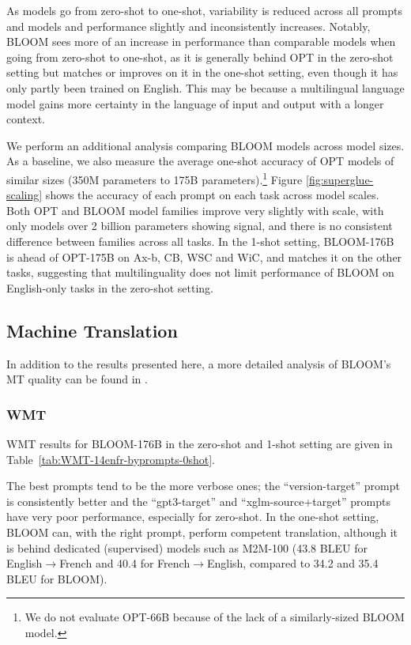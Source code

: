 As models go from zero-shot to one-shot, variability is reduced across all prompts and models and performance slightly and inconsistently increases. Notably, BLOOM sees more of an increase in performance than comparable models when going from zero-shot to one-shot, as it is generally behind OPT in the zero-shot setting but matches or improves on it in the one-shot setting, even though it has only partly been trained on English. This may be because a multilingual language model gains more certainty in the language of input and output with a longer context.

We perform an additional analysis comparing BLOOM models across model sizes.  As a baseline, we also measure the average one-shot accuracy of OPT models of similar sizes (350M parameters to 175B parameters).\footnote{We do not evaluate OPT-66B because of the lack of a similarly-sized BLOOM model.} Figure \ref{fig:superglue-scaling} shows the accuracy of each prompt on each task across model scales. Both OPT and BLOOM model families improve very slightly with scale, with only models over 2 billion parameters showing signal, and there is no consistent difference between families across all tasks. In the 1-shot setting, BLOOM-176B is ahead of OPT-175B on Ax-b, CB, WSC and WiC, and matches it on the other tasks, suggesting that multilinguality does not limit performance of BLOOM on English-only tasks in the zero-shot setting.

\subsection{Machine Translation}
\label{sec:eval:mt}

In addition to the results presented here, a more detailed analysis of BLOOM's MT quality can be found in \citep{bawden-yvon-2023-mt-bloom}.

\subsubsection{WMT}
\label{sec:eval:mt:wmt}

WMT results for BLOOM-176B in the zero-shot and 1-shot setting are given in Table~\ref{tab:WMT-14enfr-byprompts-0shot}.

The best prompts tend to be the more verbose ones; the ``version-target'' prompt is consistently better and the ``gpt3-target'' and ``xglm-source+target'' prompts have very poor performance, especially for zero-shot. In the one-shot setting, BLOOM can, with the right prompt, perform competent translation, although it is behind dedicated (supervised) models such as M2M-100 (43.8 BLEU for English$\rightarrow$French and 40.4 for French$\rightarrow$English, compared to 34.2 and 35.4 BLEU for BLOOM).


